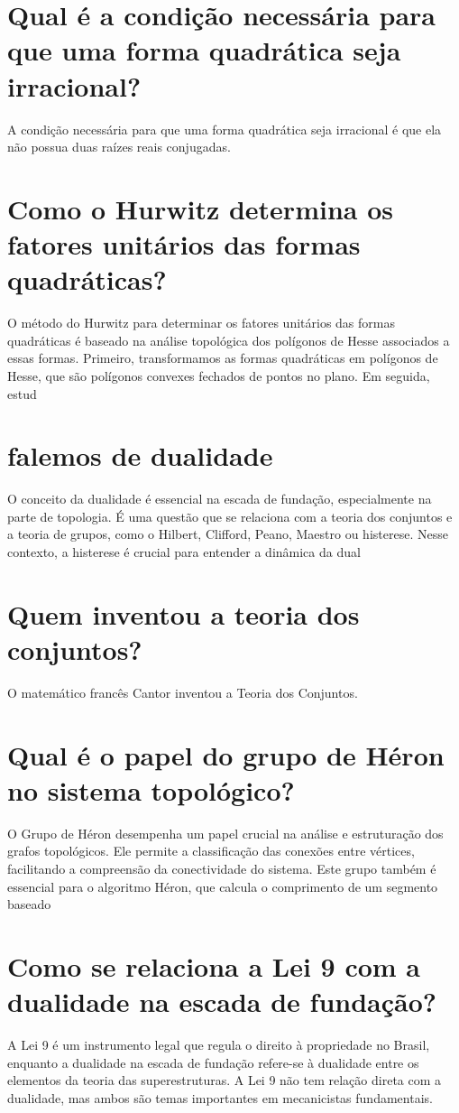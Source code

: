 \documentclass[11pt,a4paper]{article}
\begin{document}
\section{Qual é a condição necessária para que uma forma quadrática seja irracional?}
A condição necessária para que uma forma quadrática seja irracional é que ela não possua duas raízes reais conjugadas.

\section{Como o Hurwitz determina os fatores unitários das formas quadráticas?}
O método do Hurwitz para determinar os fatores unitários das formas quadráticas é baseado na análise topológica dos polígonos de Hesse associados a essas formas. Primeiro, transformamos as formas quadráticas em polígonos de Hesse, que são polígonos convexes fechados de pontos no plano. Em seguida, estud

\section{falemos de dualidade}
O conceito da dualidade é essencial na escada de fundação, especialmente na parte de topologia. É uma questão que se relaciona com a teoria dos conjuntos e a teoria de grupos, como o Hilbert, Clifford, Peano, Maestro ou histerese. Nesse contexto, a histerese é crucial para entender a dinâmica da dual

\section{Quem inventou a teoria dos conjuntos?}
O matemático francês Cantor inventou a Teoria dos Conjuntos.

\section{Qual é o papel do grupo de Héron no sistema topológico?}
O Grupo de Héron desempenha um papel crucial na análise e estruturação dos grafos topológicos. Ele permite a classificação das conexões entre vértices, facilitando a compreensão da conectividade do sistema. Este grupo também é essencial para o algoritmo Héron, que calcula o comprimento de um segmento baseado

\section{Como se relaciona a Lei 9 com a dualidade na escada de fundação?}
A Lei 9 é um instrumento legal que regula o direito à propriedade no Brasil, enquanto a dualidade na escada de fundação refere-se à dualidade entre os elementos da teoria das superestruturas. A Lei 9 não tem relação direta com a dualidade, mas ambos são temas importantes em mecanicistas fundamentais.
\end{document}
